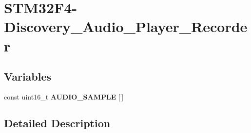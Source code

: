 \hypertarget{group___s_t_m32_f4-_discovery___audio___player___recorder}{}\section{S\+T\+M32\+F4-\/\+Discovery\+\_\+\+Audio\+\_\+\+Player\+\_\+\+Recorder}
\label{group___s_t_m32_f4-_discovery___audio___player___recorder}
\subsection*{Variables}
\begin{DoxyCompactItemize}
\item 
\mbox{\label{group___s_t_m32_f4-_discovery___audio___player___recorder_gaff44489d9bbb1d8dd11b114142349299}} 
const uint16\+\_\+t {\bfseries A\+U\+D\+I\+O\+\_\+\+S\+A\+M\+P\+LE} \mbox{[}$\,$\mbox{]}
\end{DoxyCompactItemize}


\subsection{Detailed Description}
